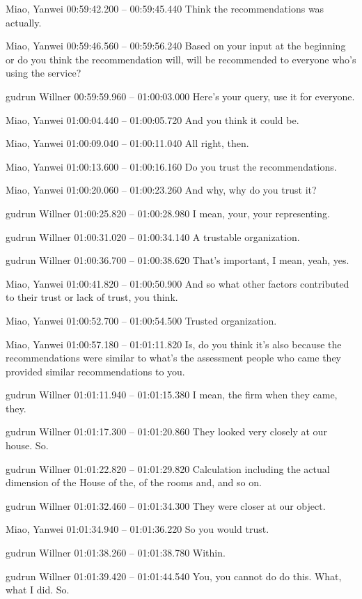 {Miao, Yanwei 00:59:42.200 -- 00:59:45.440
Think the recommendations was actually.

Miao, Yanwei 00:59:46.560 -- 00:59:56.240
Based on your input at the beginning or do you think the recommendation will, will be recommended to everyone who's using the service?

gudrun Willner 00:59:59.960 -- 01:00:03.000
Here's your query, use it for everyone.

Miao, Yanwei 01:00:04.440 -- 01:00:05.720
And you think it could be.

Miao, Yanwei 01:00:09.040 -- 01:00:11.040
All right, then.

Miao, Yanwei 01:00:13.600 -- 01:00:16.160
Do you trust the recommendations.

Miao, Yanwei 01:00:20.060 -- 01:00:23.260
And why, why do you trust it?

gudrun Willner 01:00:25.820 -- 01:00:28.980
I mean, your, your representing.

gudrun Willner 01:00:31.020 -- 01:00:34.140
A trustable organization.

gudrun Willner 01:00:36.700 -- 01:00:38.620
That's important, I mean, yeah, yes.

Miao, Yanwei 01:00:41.820 -- 01:00:50.900
And so what other factors contributed to their trust or lack of trust, you think.

Miao, Yanwei 01:00:52.700 -- 01:00:54.500
Trusted organization.

Miao, Yanwei 01:00:57.180 -- 01:01:11.820
Is, do you think it's also because the recommendations were similar to what's the assessment people who came they provided similar recommendations to you.

gudrun Willner 01:01:11.940 -- 01:01:15.380
I mean, the firm when they came, they.

gudrun Willner 01:01:17.300 -- 01:01:20.860
They looked very closely at our house. So.

gudrun Willner 01:01:22.820 -- 01:01:29.820
Calculation including the actual dimension of the House of the, of the rooms and, and so on.

gudrun Willner 01:01:32.460 -- 01:01:34.300
They were closer at our object.

Miao, Yanwei 01:01:34.940 -- 01:01:36.220
So you would trust.

gudrun Willner 01:01:38.260 -- 01:01:38.780
Within.

gudrun Willner 01:01:39.420 -- 01:01:44.540
You, you cannot do do this. What, what I did. So.

}
